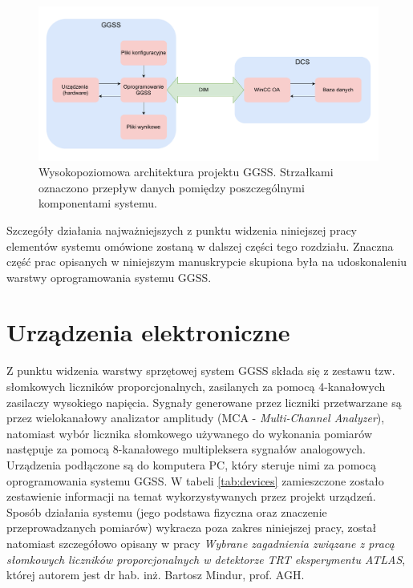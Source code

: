 \begin{figure}[H]
\centering
\includegraphics[width=\textwidth]{components/ggss_images/high_level_architecture.pdf}
\caption{Wysokopoziomowa architektura projektu GGSS. Strzałkami oznaczono przepływ danych pomiędzy poszczególnymi komponentami systemu.}
\label{fig:high_level_architecture}
\end{figure}


Szczegóły działania najważniejszych z punktu widzenia niniejszej pracy elementów systemu omówione zostaną w dalszej części tego rozdziału. Znaczna część prac opisanych w niniejszym manuskrypcie skupiona była na udoskonaleniu warstwy oprogramowania systemu GGSS.


\section{Urządzenia elektroniczne}
Z punktu widzenia warstwy sprzętowej system GGSS składa się z zestawu tzw. słomkowych liczników proporcjonalnych, zasilanych za pomocą 4-kanałowych zasilaczy wysokiego napięcia. Sygnały generowane przez liczniki przetwarzane są przez wielokanałowy analizator amplitudy (MCA - \emph{Multi-Channel Analyzer}), natomiast wybór licznika słomkowego używanego do wykonania pomiarów następuje za pomocą 8-kanałowego multipleksera sygnałów analogowych. Urządzenia podłączone są do komputera PC, który steruje nimi za pomocą oprogramowania systemu GGSS. W tabeli \ref{tab:devices} zamieszczone zostało zestawienie informacji na temat wykorzystywanych przez projekt urządzeń. Sposób działania systemu (jego podstawa fizyczna oraz znaczenie przeprowadzanych pomiarów) wykracza poza zakres niniejszej pracy, został natomiast szczegółowo opisany w pracy \emph{Wybrane zagadnienia związane z pracą słomkowych liczników proporcjonalnych w detektorze TRT eksperymentu ATLAS}, której autorem jest dr hab. inż. Bartosz Mindur, prof. AGH.

\clearpage

